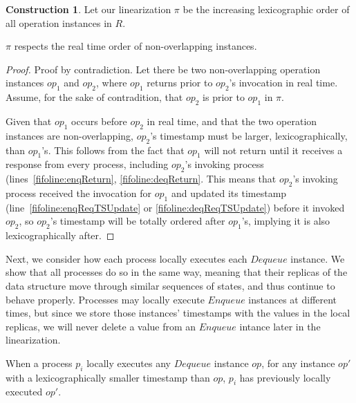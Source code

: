 \documentclass[a4paper,anonymous,USenglish]{lipics-v2021} %
\theoremstyle{definition}
\newtheorem{construction}{Construction}
\begin{document}
\begin{construction}\label{constr:fifo}
  Let our linearization $\pi$ be the increasing lexicographic order of all operation instances in $R$.
\end{construction}

\begin{lemma}\label{fifolem:realTimeOrder}
  $\pi$ respects the real time order of non-overlapping instances.
\end{lemma}
\begin{proof}
  Proof by contradiction. Let there be two non-overlapping operation instances $op_1$ and $op_2$, where $op_1$ returns prior to $op_2$'s invocation in real time.  Assume, for the sake of contradition, that $op_2$ is prior to $op_1$ in $\pi$.
  
  Given that $op_1$ occurs before $op_2$ in real time, and that the two operation instances are non-overlapping, $op_2$'s timestamp must be larger, lexicographically, than $op_1$'s.  This follows from the fact that $op_1$ will not return until it receives a response from every process, including $op_2$'s invoking process (lines~\ref{fifoline:enqReturn}, \ref{fifoline:deqReturn}.  This means that $op_2$'s invoking process received the invocation for $op_1$ and updated its timestamp (line~\ref{fifoline:enqReqTSUpdate} or \ref{fifoline:deqReqTSUpdate}) before it invoked $op_2$, so $op_2$'s timestamp will be totally ordered after $op_1$'s, implying it is also lexicographically after.
\end{proof}

Next, we consider how each process locally executes each $Dequeue$ instance.  We show that all processes do so in the same way, meaning that their replicas of the data structure move through similar sequences of states, and thus continue to behave properly.  Processes may locally execute $Enqueue$ instances at different times, but since we store those instances' timestamps with the values in the local replicas, we will never delete a value from an $Enqueue$ intance later in the linearization.

\begin{lemma}\label{fifolem:prevLocalExec}
  When a process $p_i$ locally executes any $Dequeue$ instance $op$, for any instance $op'$ with a lexicographically smaller timestamp than $op$, $p_i$ has previously locally executed $op'$.
\end{lemma}
\end{document}
